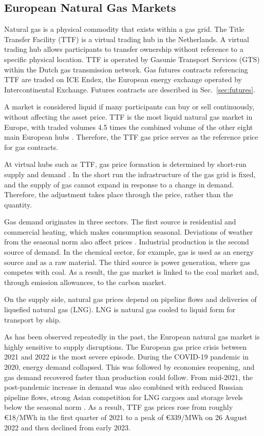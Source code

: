 \subsection{European Natural Gas Markets}\label{sec:gas-markets}
Natural gas is a physical commodity that exists within a gas grid. The Title Transfer Facility (TTF) is a virtual trading hub in the Netherlands. A virtual trading hub allows participants to transfer ownership without reference to a specific physical location. TTF is operated by Gasunie Transport Services (GTS) within the Dutch gas transmission network.  Gas futures contracts referencing TTF are traded on ICE Endex, the European energy exchange operated by Intercontinental Exchange. Futures contracts are described in Sec.~\ref{sec:futures}.

A market is considered liquid if many participants can buy or sell continuously, without affecting the asset price. TTF is the most liquid natural gas market in Europe, with traded volumes 4.5 times the combined volume of the other eight main European hubs \parencite{heatherEuropeanTradedGas2026}. Therefore, the TTF gas price serves as the reference price for gas contracts. 

At virtual hubs such as TTF, gas price formation is determined by short-run supply and demand \parencite{obadiDRIVINGFUNDAMENTALSNATURAL2020}. In the short run the infrastructure of the gas grid is fixed, and the supply of gas cannot expand in response to a change in demand. Therefore, the adjustment takes place through the price, rather than the quantity.

Gas demand originates in three sectors. The first source is residential and commercial heating, which makes consumption seasonal.
Deviations of weather from the seasonal norm also affect prices \parencite{brownWhatDrivesNatural2008}. Industrial production is the second source of demand. In the chemical sector, for example, gas is used as an energy source and as a raw material. The third source is power generation, where gas competes with coal. As a result, the gas market is linked to the coal market and, through emission allowances, to the carbon market.

On the supply side, natural gas prices depend on pipeline flows and deliveries of liquefied natural gas (LNG). LNG is natural gas cooled to liquid form for transport by ship. 

As has been observed repeatedly in the past, the European natural gas market is highly sensitive to supply disruptions. The European gas price crisis between 2021 and 2022 is the most severe episode. During the COVID-19 pandemic in 2020, energy demand collapsed. This was followed by economies reopening, and gas demand recovered faster than production could follow. From mid-2021, the post-pandemic increase in demand was also combined with reduced Russian pipeline flows, strong Asian competition for LNG cargoes and storage levels below the seasonal norm \parencite{heather2022unfortunate}. As a result, TTF gas prices rose from roughly €18/MWh in the first quarter of 2021 to a peak of €339/MWh on 26 August 2022 and then declined from early 2023. 

